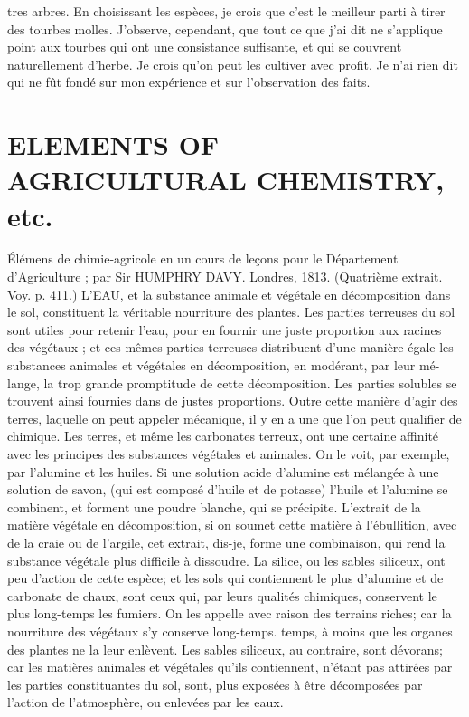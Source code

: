 \setcounter{page}{462} tres arbres. En choisissant les espèces, je crois que c'est le meilleur parti à tirer des tourbes molles. J'observe, cependant, que tout ce que j'ai dit ne s'applique point aux tourbes qui ont une consistance suffisante, et qui se couvrent naturellement d'herbe. Je crois qu'on peut les cultiver avec profit. Je n'ai rien dit qui ne fût fondé sur mon expérience et sur l'observation des faits.
\section{ELEMENTS OF AGRICULTURAL CHEMISTRY, etc.}
Élémens de chimie-agricole en un cours de leçons pour le Département d'Agriculture ; par Sir HUMPHRY DAVY. Londres, 1813. (Quatrième extrait. Voy. p. 411.)
L'EAU, et la substance animale et végétale en décomposition dans le sol, constituent la véritable nourriture des plantes. Les parties terreuses du sol sont utiles pour retenir l'eau, pour en fournir une juste proportion aux racines des végétaux ; et ces mêmes parties terreuses distribuent d'une manière égale les substances animales et végétales en décomposition, en modérant, par leur mé-\setcounter{page}{463} lange, la trop grande promptitude de cette décomposition. Les parties solubles se trouvent ainsi fournies dans de justes proportions. Outre cette manière d'agir des terres, laquelle on peut appeler mécanique, il y en a une que l'on peut qualifier de chimique. Les terres, et même les carbonates terreux, ont une certaine affinité avec les principes des substances végétales et animales. On le voit, par exemple, par l'alumine et les huiles. Si une solution acide d'alumine est mélangée à une solution de savon, (qui est composé d'huile et de potasse) l'huile et l'alumine se combinent, et forment une poudre blanche, qui se précipite. L'extrait de la matière végétale en décomposition, si on soumet cette matière à l'ébullition, avec de la craie ou de l'argile, cet extrait, dis-je, forme une combinaison, qui rend la substance végétale plus difficile à dissoudre. La silice, ou les sables siliceux, ont peu d'action de cette espèce; et les sols qui contiennent le plus d'alumine et de carbonate de chaux, sont ceux qui, par leurs qualités chimiques, conservent le plus long-temps les fumiers. On les appelle avec raison des terrains riches; car la nourriture des végétaux s'y conserve long-temps.\setcounter{page}{464} temps, à moins que les organes des plantes ne la leur enlèvent. Les sables siliceux, au contraire, sont dévorans; car les matières animales et végétales qu'ils contiennent, n'étant pas attirées par les parties constituantes du sol, sont, plus exposées à être décomposées par l'action de l'atmosphère, ou enlevées par les eaux.
